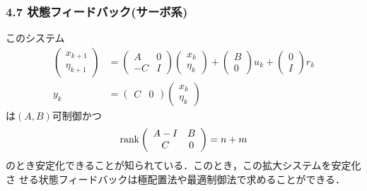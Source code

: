 \begin{frame}[t]
\frametitle{4.7 状態フィードバック(サーボ系)}
\addtocounter{equation}{-2}
このシステム
\begin{align}
 \left(\begin{array}{c}
	x_{k+1} \\
	\eta_{k+1}
       \end{array}\right)
 &=
 \left(\begin{array}{cc}
        A  & 0 \\
	-C & I
       \end{array}\right)
 \left(\begin{array}{c}
        x_k \\
	\eta_k
       \end{array}\right)
 +
 \left(\begin{array}{c}
	B \\
	0
       \end{array}\right)
 u_k +
 \left(\begin{array}{c}
        0 \\
	I
       \end{array}\right) 
 r_k \\
 y_k &=
  \left(\begin{array}{cc}
         C & 0 
	\end{array}\right)
  \left(\begin{array}{c}
         x_k \\
	 \eta_k
	\end{array}\right)
\end{align}
は$(A, B)$可制御かつ
\begin{equation}
 \mathop{\rm rank}\nolimits \left(\begin{array}{cc}
	      A - I  & B \\
	      C      & 0
	     \end{array}\right)
 = n + m
\end{equation}
のとき安定化できることが知られている．このとき，この拡大システムを安定化さ
せる状態フィードバックは極配置法や最適制御法で求めることができる．
\end{frame}


